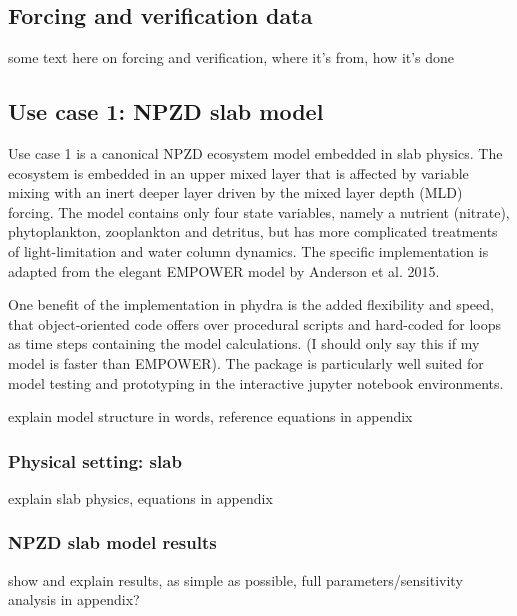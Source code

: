 \documentclass[journal abbreviation, manuscript]{copernicus}
\begin{document}

\subsection{Forcing and verification data}

some text here on forcing and verification, where it's from, how it's done


\subsection{Use case 1: NPZD slab model}

Use case 1 is a canonical NPZD ecosystem model embedded in slab physics. The ecosystem is embedded in an upper mixed layer that is affected by variable mixing with an inert deeper layer driven by the mixed layer depth (MLD) forcing. The model contains only four state variables, namely a nutrient  (nitrate), phytoplankton, zooplankton and detritus, but has more complicated treatments of light-limitation and water column dynamics. The specific implementation is adapted from the elegant EMPOWER model by Anderson et al. 2015. 

One benefit of the implementation in phydra is the added flexibility and speed, that object-oriented code offers over procedural scripts and hard-coded for loops as time steps containing the model calculations. (I should only say this if my model is faster than EMPOWER). The package is particularly well suited for model testing and prototyping in the interactive jupyter notebook environments. 

explain model structure in words, reference equations in appendix

\subsubsection{Physical setting: slab}
explain slab physics, equations in appendix



\subsubsection{NPZD slab model results}
show and explain results, as simple as possible, full parameters/sensitivity analysis in appendix?
\end{document}
